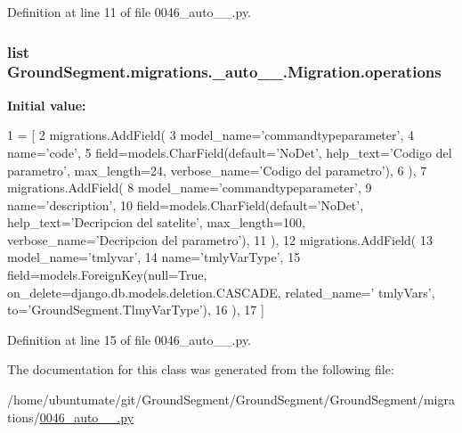Definition at line 11 of file 0046\+\_\+auto\+\_\+\_.\+py.

\hypertarget{class_ground_segment_1_1migrations_1_10046__auto__20170207__1208_1_1_migration_a1c1c543acc9079dd174b66bd24c6f165}{}
\subsubsection[{operations}]{\setlength{\rightskip}{0pt plus 5cm}list Ground\+Segment.\+migrations.\+\_\+auto\+\_\+\_.\+Migration.\+operations\hspace{0.3cm}{\ttfamily [static]}}\label{class_ground_segment_1_1migrations_1_10046__auto__20170207__1208_1_1_migration_a1c1c543acc9079dd174b66bd24c6f165}
{\bfseries Initial value\+:}
\begin{DoxyCode}
1 = [
2         migrations.AddField(
3             model\_name=\textcolor{stringliteral}{'commandtypeparameter'},
4             name=\textcolor{stringliteral}{'code'},
5             field=models.CharField(default=\textcolor{stringliteral}{'NoDet'}, help\_text=\textcolor{stringliteral}{'Codigo del parametro'}, max\_length=24, 
      verbose\_name=\textcolor{stringliteral}{'Codigo del parametro'}),
6         ),
7         migrations.AddField(
8             model\_name=\textcolor{stringliteral}{'commandtypeparameter'},
9             name=\textcolor{stringliteral}{'description'},
10             field=models.CharField(default=\textcolor{stringliteral}{'NoDet'}, help\_text=\textcolor{stringliteral}{'Decripcion del satelite'}, max\_length=100, 
      verbose\_name=\textcolor{stringliteral}{'Decripcion del parametro'}),
11         ),
12         migrations.AddField(
13             model\_name=\textcolor{stringliteral}{'tmlyvar'},
14             name=\textcolor{stringliteral}{'tmlyVarType'},
15             field=models.ForeignKey(null=\textcolor{keyword}{True}, on\_delete=django.db.models.deletion.CASCADE, related\_name=\textcolor{stringliteral}{'
      tmlyVars'}, to=\textcolor{stringliteral}{'GroundSegment.TlmyVarType'}),
16         ),
17     ]
\end{DoxyCode}


Definition at line 15 of file 0046\+\_\+auto\+\_\+\_.\+py.



The documentation for this class was generated from the following file\+:\begin{DoxyCompactItemize}
\item 
/home/ubuntumate/git/\+Ground\+Segment/\+Ground\+Segment/\+Ground\+Segment/migrations/\hyperlink{0046__auto__20170207__1208_8py}{0046\+\_\+auto\+\_\+\_.\+py}\end{DoxyCompactItemize}
